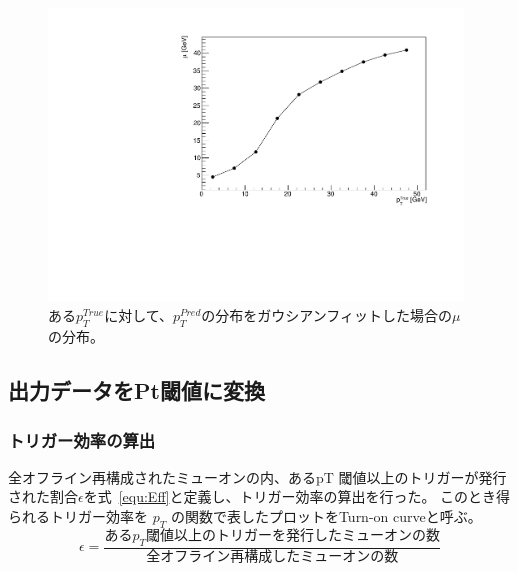 \begin{figure}[htb]
  \centering
  \includegraphics[clip, width=11cm]{fig/4/tp_Gausmean_Data.pdf}
  \caption{ある$p_T^{True}$に対して、$p_T^{Pred}$の分布をガウシアンフィットした場合の$\mu$の分布。}
  \label{fig:Gausmu_Data}
\end{figure}






\subsection{出力データをPt閾値に変換}
\subsubsection{トリガー効率の算出}
全オフライン再構成されたミューオンの内、あるpT 閾値以上のトリガーが発行された割合$\epsilon$を式~\eqref{equ:Eff}と定義し、トリガー効率の算出を行った。
このとき得られるトリガー効率を $p_T$ の関数で表したプロットをTurn-on curveと呼ぶ。
\begin{equation}
　   \epsilon = \frac{ある p_T 閾値以上のトリガーを発行したミューオンの数}{全オフライン再構成したミューオンの数}
　\label{equ:Eff}
\end{equation}


